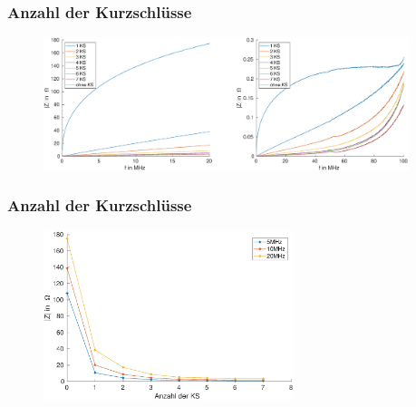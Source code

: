 \documentclass[accentcolor=tud9b, colorbacktitle, inverttitle]{tudbeamer}
\begin{document}
\begin{frame}\frametitle{Anzahl der Kurzschl\"usse}
\vspace{-1em}
\begin{figure}[h]
	\centering
	\includegraphics[width=0.95\textwidth]{impedance_numberKS_ringcore}
\end{figure}
\end{frame}


\begin{frame}\frametitle{Anzahl der Kurzschl\"usse}
 \vspace{-1em}
\begin{figure}[h]
	\centering
	\includegraphics[width=0.65\textwidth]{RK_Impedanz_numberKS_frequenz}
\end{figure}
\end{frame}
\end{document}
